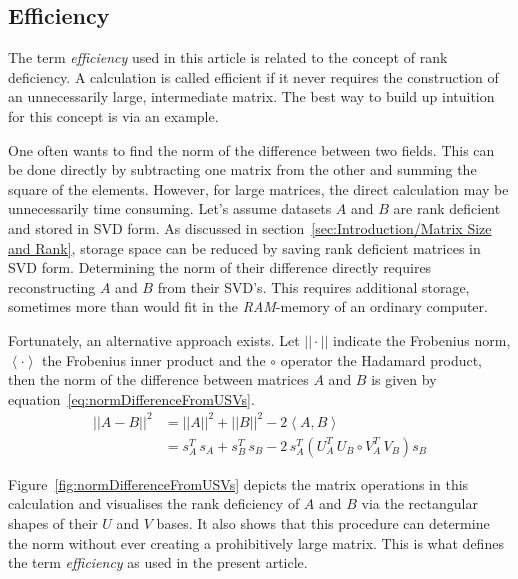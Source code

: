 \documentclass[ijgi,article,submit,moreauthors,pdftex,10pt,a4paper]{Definitions/mdpi}
\begin{document}
\subsection{Efficiency}
\label{sec:Introduction/Efficiency}

The term \textit{efficiency} used in this article is related to the concept of rank deficiency. A calculation is called efficient if it never requires the construction of an unnecessarily large, intermediate matrix. The best way to build up intuition for this concept is via an example.

One often wants to find the norm of the difference between two fields. This can be done directly by subtracting one matrix from the other and summing the square of the elements. However, for large matrices, the direct calculation may be unnecessarily time consuming. Let's assume datasets $A$ and $B$ are rank deficient and stored in SVD form. As discussed in section~\ref{sec:Introduction/Matrix Size and Rank}, storage space can be reduced by saving rank deficient matrices in SVD form. Determining the norm of their difference directly requires reconstructing $A$ and $B$ from their SVD's. This requires additional storage, sometimes more than would fit in the \textit{RAM}-memory of an ordinary computer.

Fortunately, an alternative approach exists. Let $|| \cdot ||$ indicate the Frobenius norm, $\left\langle \cdot \right\rangle$ the Frobenius inner product and the $\circ$ operator the Hadamard product, then the norm of the difference between matrices $A$ and $B$ is given by equation~\ref{eq:normDifferenceFromUSVs}.
\begin{equation}
\label{eq:normDifferenceFromUSVs}
\begin{split}
||A-B||^{2} & = ||A||^{2} + ||B||^{2} - 2 \left\langle A, B \right\rangle \\
& = s_{A}^{T} \, s_{A} + s_{B}^{T} \, s_{B} - 2 \, s_{A}^{T} \left( U_{A}^{T} \, U_{B} \circ V_{A}^{T} \, V_{B} \right) s_{B}
\end{split}
\end{equation}

Figure~\ref{fig:normDifferenceFromUSVs} depicts the matrix operations in this calculation and visualises the rank deficiency of $A$ and $B$ via the rectangular shapes of their $U$ and $V$ bases. It also shows that this procedure can determine the norm without ever creating a prohibitively large matrix. This is what defines the term \textit{efficiency} as used in the present article.
\end{document}
